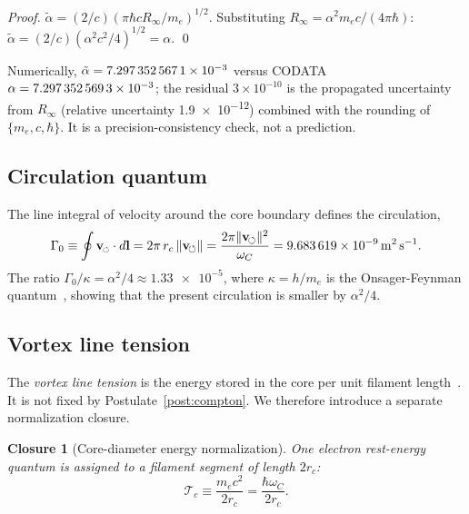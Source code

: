 \documentclass[aps,pra,preprint,longbibliography,nofootinbib]{revtex4-2}
\newtheorem{closure}{Closure}
\newcommand{\rotarrow}{%
  \mathchoice{\mkern-2mu\scriptstyle\boldsymbol{\circlearrowleft}}%
             {\mkern-2mu\scriptstyle\boldsymbol{\circlearrowleft}}%
             {\mkern-2mu\scriptscriptstyle\boldsymbol{\circlearrowleft}}%
             {\mkern-2mu\scriptscriptstyle\boldsymbol{\circlearrowleft}}}
\newcommand{\vc}{\mathbf{v}_{\rotarrow}}        %
\newcommand{\vnorm}{\lVert\mathbf{v}_{\!\boldsymbol{\circlearrowleft}}\rVert} %
\newcommand{\rc}{r_c}                            %
\newcommand{\omC}{\omega_C}                      %
\newcommand{\Rinf}{R_\infty}                     %
\newcommand{\Tc}{\mathcal{T}_c}                  %
\newcommand{\Gz}{\Gamma_0}                       %
\begin{document}
\begin{proof}
$\tilde\alpha = (2/c)(\pi\hbar c\Rinf/m_e)^{1/2}$.
Substituting $\Rinf = \alpha^2 m_e c/(4\pi\hbar)$:
$\tilde\alpha = (2/c)(\alpha^2 c^2/4)^{1/2} = \alpha$. \qed
\end{proof}

Numerically, $\tilde\alpha = \num{7.297\,352\,567\,1e-3}$
versus CODATA $\alpha = \num{7.297\,352\,569\,3e-3}$;
the residual $3\times10^{-10}$ is the propagated uncertainty
from $\Rinf$ (relative uncertainty \SI{1.9e-12}{}) combined with
the rounding of $\{m_e, c, \hbar\}$.
It is a precision-consistency check, not a prediction.

\subsection{Circulation quantum}
\label{sec:Gamma0}

The line integral of velocity around the core boundary defines the
circulation,
\begin{equation}
  \Gz \equiv \oint \vc\cdot d\mathbf{l}
           = 2\pi\,\rc\,\vnorm
           = \frac{2\pi\vnorm^2}{\omC}
           = \SI{9.683\,619e-9}{\meter\squared\per\second}.
  \label{eq:Gamma0}
\end{equation}
The ratio $\Gz/\kappa = \alpha^2/4 \approx \num{1.33e-5}$,
where $\kappa = h/m_e$ is the Onsager-Feynman quantum~\cite{Onsager1949,Feynman1955},
showing that the present circulation is smaller by $\alpha^2/4$.

\subsection{Vortex line tension}
\label{sec:Tc}

The \emph{vortex line tension} is the energy stored in the core per
unit filament length~\cite{Saffman1992}.  It is not fixed by
Postulate~\ref{post:compton}.  We therefore introduce a separate
normalization closure.

\begin{closure}[Core-diameter energy normalization]
\label{cl:tension}
One electron rest-energy quantum is assigned to a filament segment of
length $2\rc$:
\begin{equation}
  \Tc \equiv \frac{m_e c^2}{2\rc} = \frac{\hbar\omC}{2\rc}.
  \label{eq:Tc_def}
\end{equation}
\end{closure}
\end{document}
